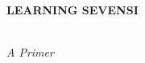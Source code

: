 \thispagestyle{empty}
\pagestyle{empty}

\begin{titlepage}
\label{text}

\begin{center}
\begin{Large}\textbf{LEARNING SEVENSI}\end{Large}\\
\emph{A Primer}
\end{center}

\end{titlepage}

\emptybreak

\pagestyle{plain}
